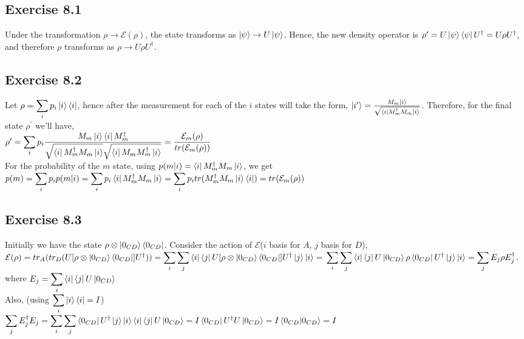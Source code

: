 \documentclass[a4paper,12pt]{article}
\begin{document}
\subsection*{Exercise 8.1}
Under the transformation $\rho \rightarrow \mathcal{E}(\rho)$, the state transforms as
$\ket{\psi}\rightarrow U\ket{\psi}$. Hence, the new density operator is 
$\rho^\prime =U\ket{\psi}\bra{\psi}U^\dagger=U\rho U^\dagger$, and therefore $\rho$ transforms as
$\rho \rightarrow U\rho U^\dagger$.
\subsection*{Exercise 8.2}
Let $\rho =\displaystyle \sum_i p_i \ket{i}\bra{i}$, hence after the measurement
for each of the $i$ states will take the form, $\ket{i^\prime}=\frac{M_m\ket{i}}{\sqrt{\bra{i}
M_m^\dagger M_m\ket{i}}}$. Therefore, for the final state $\rho^\prime$ we'll have,\\
$\rho^\prime =\displaystyle \sum_i p_i \frac{M_m\ket{i}\bra{i}M_m^\dagger}{\sqrt{\bra{i}
M_m^\dagger M_m\ket{i}}\sqrt{\bra{i}
M_m M_m^\dagger\ket{i}}}=\frac{\mathcal{E}_m(\rho)}{tr(\mathcal{E}_m(\rho))}$\\
For the probability of the $m$ state, using $p(m|i)=\bra{i}M_m^\dagger M_m\ket{i}$, we get\\
$p(m)=\displaystyle \sum_{i} p_i p(m|i)=
\displaystyle \sum_{i} p_i \bra{i}M_m^\dagger M_m\ket{i}=
\displaystyle \sum_{i} p_i tr(M_m^\dagger M_m\ket{i}\bra{i})=
tr(\mathcal{E}_m(\rho))$
\subsection*{Exercise 8.3}
Initially we have the state $\rho\otimes \ket{0_{CD}}\bra{0_{CD}}$. Consider the action
of $\mathcal{E}$($i$ basis for $A$, $j$ basis for $D$),\\
$\mathcal{E}(\rho)=tr_A(tr_D(U[\rho\otimes \ket{0_{CD}}\bra{0_{CD}}]U^\dagger))=
\displaystyle \sum_{i} \sum_{j} \bra{i}\bra{j}U[\rho\otimes \ket{0_{CD}}\bra{0_{CD}}]U^\dagger
\ket{j}\ket{i}=\\
\displaystyle \sum_{i} \sum_{j} \bra{i}\bra{j}U\ket{0_{CD}}\rho\bra{0_{CD}}U^\dagger
\ket{j}\ket{i}=\displaystyle \sum_j E_j\rho E_j^\dagger$.\\
where $E_j=\displaystyle \sum_i  \bra{i}\bra{j}U\ket{0_{CD}}$\\
Also, (using $\displaystyle \sum_{i} \ket{i}\bra{i}=I$)\\
$\displaystyle \sum_j E_j^\dagger E_j=\displaystyle \sum_i\sum_j 
\bra{0_{CD}}U^\dagger \ket{j}\ket{i}\bra{i}\bra{j}U\ket{0_{CD}}=
I\bra{0_{CD}}U^\dagger U\ket{0_{CD}} =I\braket{0_{CD}|0_{CD}}=I$\\
\end{document}
